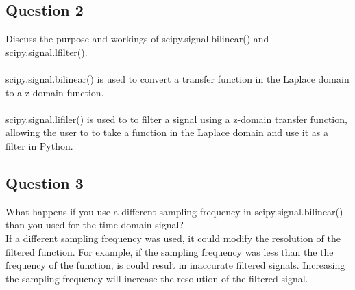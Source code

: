 \documentclass[12pt,a4paper]{article}
\begin{document}
\subsection{Question 2}
Discuss the purpose and workings of scipy.signal.bilinear() and scipy.signal.lfilter().\\
\\
scipy.signal.bilinear() is used to convert a transfer function in the Laplace domain to a z-domain function.\\
\\
scipy.signal.lifiler() is used to to filter a signal using a z-domain transfer function, allowing the user to to take a function in the Laplace domain and use it as a filter in Python.
\subsection{Question 3}
What happens if you use a different sampling frequency in scipy.signal.bilinear() than you used for the time-domain signal?\\
If a different sampling frequency was used, it could modify the resolution of the filtered function. For example, if the sampling frequency was less than the the frequency of the function, is could result in inaccurate filtered signals. Increasing the sampling frequency will increase the resolution of the filtered signal.
\end{document}
